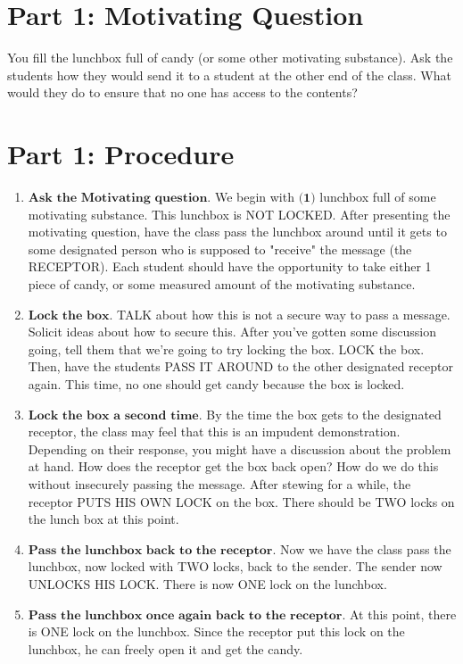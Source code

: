 \documentclass[a4paper]{article}
\begin{document}
\section{Part 1: Motivating Question}

You fill the lunchbox full of candy (or some other motivating substance). Ask the students how they would send it to a student at the other end of the class. What would they do to ensure that no one has access to the contents?

\section{Part 1: Procedure}

\begin{enumerate}

\item $\textbf{Ask the Motivating question.}$ We begin with $\textbf{(1)}$ lunchbox full of some motivating substance. This lunchbox is NOT LOCKED. After presenting the motivating question, have the class pass the lunchbox around until it gets to some designated person who is supposed to "receive" the message (the RECEPTOR). Each student should have the opportunity to take either 1 piece of candy, or some measured amount of the motivating substance.

\item $\textbf{Lock the box.}$ TALK about how this is not a secure way to pass a message. Solicit ideas about how to secure this. After you've gotten some discussion going, tell them that we're going to try locking the box. LOCK the box. Then, have the students PASS IT AROUND to the other designated receptor again. This time, no one should get candy because the box is locked.

\item $\textbf{Lock the box a second time.}$ By the time the box gets to the designated receptor, the class may feel that this is an impudent demonstration. Depending on their response, you might have a discussion about the problem at hand. How does the receptor get the box back open? How do we do this without insecurely passing the message. After stewing for a while, the receptor PUTS HIS OWN LOCK on the box. There should be TWO locks on the lunch box at this point.

\item $\textbf{Pass the lunchbox back to the receptor.}$ Now we have the class pass the lunchbox, now locked with TWO locks, back to the sender. The sender now UNLOCKS HIS LOCK. There is now ONE lock on the lunchbox.

\item $\textbf{Pass the lunchbox once again back to the receptor.}$ At this point, there is ONE lock on the lunchbox. Since the receptor put this lock on the lunchbox, he can freely open it and get the candy.

\end{enumerate}
\end{document}
